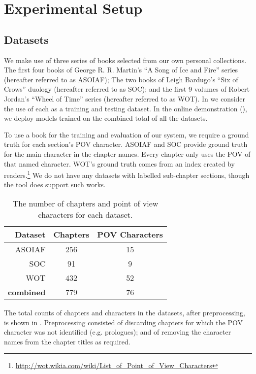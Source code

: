 \documentclass[]{book}
\begin{document}
\section{Experimental Setup}\label{sec:experimental-setup}
\subsection{Datasets}
We make use of three series of books selected from our own personal collections.
The first four books of George R. R. Martin's ``A Song of Ice and Fire'' series (hereafter referred to as ASOIAF);
The two books of  Leigh Bardugo's ``Six of Crows'' duology (hereafter referred to as SOC);
and the first 9 volumes of Robert Jordan's ``Wheel of Time'' series (hereafter referred to as WOT).
In  we consider the use of each as a training and testing dataset.
In the online demonstration (), we deploy models trained on the combined total of all the datasets.

To use a book for the training and evaluation of our system, we require a ground truth for each section's POV character.
ASOIAF and SOC provide ground truth for the main character in the chapter names.
Every chapter only uses the POV of that named character.
WOT's ground truth comes from an index created by readers.\footnote{\url{http://wot.wikia.com/wiki/List_of_Point_of_View_Characters}}
We do not have any datasets with labelled sub-chapter sections, though the tool does support such works.


\begin{table}
	\begin{tabular}{rcc}
		Dataset & Chapters & POV Characters\\
		\toprule
		ASOIAF  & 256	&	15\\
		SOC		& 91	&	9\\
		WOT     & 432   &   52\\
		\midrule
		\textbf{combined}  &  779 & 76
	\end{tabular}
	\caption{The number of chapters and point of view characters for each dataset. \label{tbl:datasets}}
\end{table}

The total counts of chapters and characters in the datasets, after preprocessing, is shown in .
Preprocessing consisted of  discarding chapters for which the POV character was not identified (e.g. prologues); and of removing the character names from the chapter titles as required.
\end{document}
